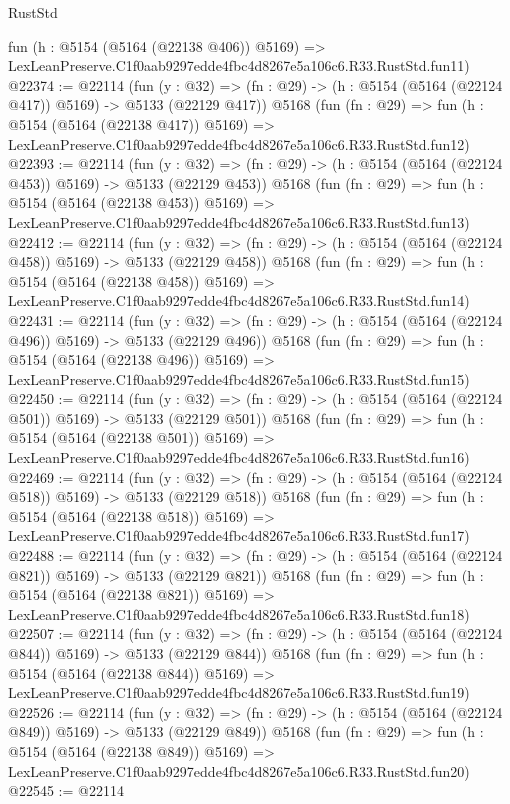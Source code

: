 \begin{lexlean}{RustStd}
\begin{coremodule}
    fun (h : @5154 (@5164 (@22138 @406)) @5169) =>
    LexLeanPreserve.C1f0aab9297edde4fbc4d8267e5a106c6.R33.RustStd.fun11)
@22374 := @22114
    (fun (y : @32) => (fn : @29) -> (h : @5154 (@5164 (@22124 @417)) @5169) -> @5133 (@22129 @417))
    @5168
    (fun (fn : @29) =>
    fun (h : @5154 (@5164 (@22138 @417)) @5169) =>
    LexLeanPreserve.C1f0aab9297edde4fbc4d8267e5a106c6.R33.RustStd.fun12)
@22393 := @22114
    (fun (y : @32) => (fn : @29) -> (h : @5154 (@5164 (@22124 @453)) @5169) -> @5133 (@22129 @453))
    @5168
    (fun (fn : @29) =>
    fun (h : @5154 (@5164 (@22138 @453)) @5169) =>
    LexLeanPreserve.C1f0aab9297edde4fbc4d8267e5a106c6.R33.RustStd.fun13)
@22412 := @22114
    (fun (y : @32) => (fn : @29) -> (h : @5154 (@5164 (@22124 @458)) @5169) -> @5133 (@22129 @458))
    @5168
    (fun (fn : @29) =>
    fun (h : @5154 (@5164 (@22138 @458)) @5169) =>
    LexLeanPreserve.C1f0aab9297edde4fbc4d8267e5a106c6.R33.RustStd.fun14)
@22431 := @22114
    (fun (y : @32) => (fn : @29) -> (h : @5154 (@5164 (@22124 @496)) @5169) -> @5133 (@22129 @496))
    @5168
    (fun (fn : @29) =>
    fun (h : @5154 (@5164 (@22138 @496)) @5169) =>
    LexLeanPreserve.C1f0aab9297edde4fbc4d8267e5a106c6.R33.RustStd.fun15)
@22450 := @22114
    (fun (y : @32) => (fn : @29) -> (h : @5154 (@5164 (@22124 @501)) @5169) -> @5133 (@22129 @501))
    @5168
    (fun (fn : @29) =>
    fun (h : @5154 (@5164 (@22138 @501)) @5169) =>
    LexLeanPreserve.C1f0aab9297edde4fbc4d8267e5a106c6.R33.RustStd.fun16)
@22469 := @22114
    (fun (y : @32) => (fn : @29) -> (h : @5154 (@5164 (@22124 @518)) @5169) -> @5133 (@22129 @518))
    @5168
    (fun (fn : @29) =>
    fun (h : @5154 (@5164 (@22138 @518)) @5169) =>
    LexLeanPreserve.C1f0aab9297edde4fbc4d8267e5a106c6.R33.RustStd.fun17)
@22488 := @22114
    (fun (y : @32) => (fn : @29) -> (h : @5154 (@5164 (@22124 @821)) @5169) -> @5133 (@22129 @821))
    @5168
    (fun (fn : @29) =>
    fun (h : @5154 (@5164 (@22138 @821)) @5169) =>
    LexLeanPreserve.C1f0aab9297edde4fbc4d8267e5a106c6.R33.RustStd.fun18)
@22507 := @22114
    (fun (y : @32) => (fn : @29) -> (h : @5154 (@5164 (@22124 @844)) @5169) -> @5133 (@22129 @844))
    @5168
    (fun (fn : @29) =>
    fun (h : @5154 (@5164 (@22138 @844)) @5169) =>
    LexLeanPreserve.C1f0aab9297edde4fbc4d8267e5a106c6.R33.RustStd.fun19)
@22526 := @22114
    (fun (y : @32) => (fn : @29) -> (h : @5154 (@5164 (@22124 @849)) @5169) -> @5133 (@22129 @849))
    @5168
    (fun (fn : @29) =>
    fun (h : @5154 (@5164 (@22138 @849)) @5169) =>
    LexLeanPreserve.C1f0aab9297edde4fbc4d8267e5a106c6.R33.RustStd.fun20)
@22545 := @22114

\end{coremodule}
\end{lexlean}
